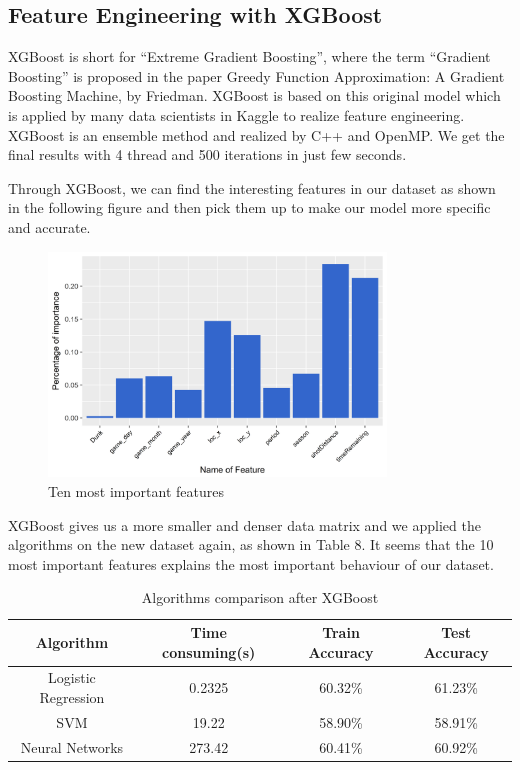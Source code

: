 \documentclass[a4paper,11pt,onecolumn,twoside]{article}
\begin{document}
\subsection{Feature Engineering with XGBoost}
XGBoost is short for ``Extreme Gradient Boosting”, where the term ``Gradient Boosting” is proposed in the paper Greedy Function Approximation: A Gradient Boosting Machine, by Friedman.  XGBoost is based on this original model which is applied by many data scientists in Kaggle to realize feature engineering. XGBoost is an ensemble method and realized by C++ and OpenMP. We get the final results with 4 thread and 500 iterations in just few seconds.\par 
Through XGBoost, we can find the interesting features in our dataset as shown in the following figure and then pick them up to make our model more specific and accurate.
\begin{figure}[htbp]
	\centering
	\includegraphics[width=0.8\textwidth]{important_features.png}
	\caption{Ten most important features}
\end{figure}
\par XGBoost gives us a more smaller and denser data matrix and we applied the algorithms on the new dataset again, as shown in Table 8. It seems that the 10 most important features explains the most important behaviour of our dataset.
\begin{table}[H]
	\centering
	\begin{tabular}{cccc}
		\midrule[1.5pt]
		\textbf{Algorithm} &\textbf{Time consuming}(s) &\textbf{Train Accuracy} &\textbf{Test Accuracy}\\
		\hline
		Logistic Regression&0.2325&60.32\%&61.23\%\\
		SVM  &19.22&58.90\%&58.91\%\\
		Neural Networks&273.42&60.41\%&60.92\%\\
		\midrule[1.5pt]
	\end{tabular}
	\caption{Algorithms comparison  after XGBoost}
\end{table}
\end{document}
